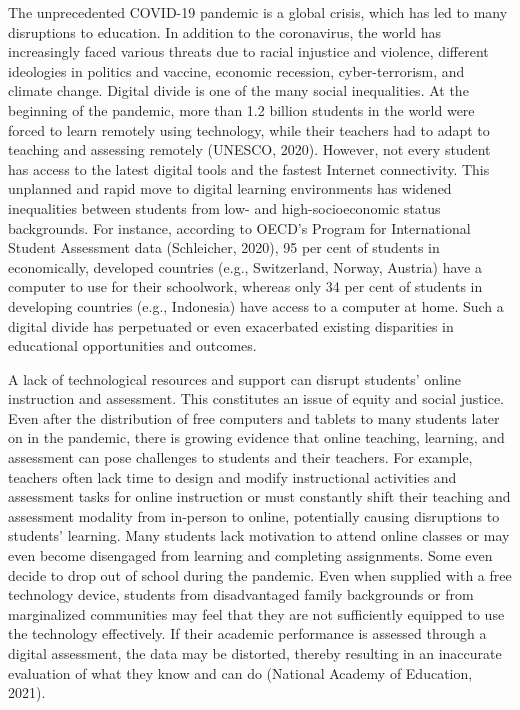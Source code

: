 \documentclass[
]{book}
\begin{document}
The unprecedented COVID-19 pandemic is a global crisis, which has led to many disruptions to education. In addition to the coronavirus, the world has increasingly faced various threats due to racial injustice and violence, different ideologies in politics and vaccine, economic recession, cyber-terrorism, and climate change. Digital divide is one of the many social inequalities. At the beginning of the pandemic, more than 1.2 billion students in the world were forced to learn remotely using technology, while their teachers had to adapt to teaching and assessing remotely (UNESCO, 2020). However, not every student has access to the latest digital tools and the fastest Internet connectivity. This unplanned and rapid move to digital learning environments has widened inequalities between students from low- and high-socioeconomic status backgrounds. For instance, according to OECD's Program for International Student Assessment data (Schleicher, 2020), 95 per cent of students in economically, developed countries (e.g., Switzerland, Norway, Austria) have a computer to use for their schoolwork, whereas only 34 per cent of students in developing countries (e.g., Indonesia) have access to a computer at home. Such a digital divide has perpetuated or even exacerbated existing disparities in educational opportunities and outcomes.

A lack of technological resources and support can disrupt students' online instruction and assessment. This constitutes an issue of equity and social justice. Even after the distribution of free computers and tablets to many students later on in the pandemic, there is growing evidence that online teaching, learning, and assessment can pose challenges to students and their teachers. For example, teachers often lack time to design and modify instructional activities and assessment tasks for online instruction or must constantly shift their teaching and assessment modality from in-person to online, potentially causing disruptions to students' learning. Many students lack motivation to attend online classes or may even become disengaged from learning and completing assignments. Some even decide to drop out of school during the pandemic. Even when supplied with a free technology device, students from disadvantaged family backgrounds or from marginalized communities may feel that they are not sufficiently equipped to use the technology effectively. If their academic performance is assessed through a digital assessment, the data may be distorted, thereby resulting in an inaccurate evaluation of what they know and can do (National Academy of Education, 2021).
\end{document}
